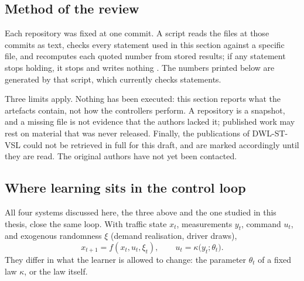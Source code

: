 \subsection{Method of the review}\label{sec:open-impl-method}

Each repository was fixed at one commit. A script reads the files at those commits as text, checks every statement used in this section against a specific file, and recomputes each quoted number from stored results; if any statement stops holding, it stops and writes nothing . The numbers printed below are generated by that script, which currently checks \OIFactCount{} statements.

Three limits apply. Nothing has been executed: this section reports what the artefacts contain, not how the controllers perform. A repository is a snapshot, and a missing file is not evidence that the authors lacked it; published work may rest on material that was never released. Finally, the publications of DWL-ST-VSL could not be retrieved in full for this draft, and are marked accordingly until they are read. The original authors have not yet been contacted.

\subsection{Where learning sits in the control loop}\label{sec:open-impl-design}

All four systems discussed here, the three above and the one studied in this thesis, close the same loop. With traffic state $x_t$, measurements $y_t$, command $u_t$, and exogenous randomness $\xi$ (demand realisation, driver draws),
\begin{equation}
x_{t+1}=f(x_t,u_t,\xi_t),\qquad u_t=\kappa\bigl(y_t;\theta_t\bigr).\label{eq:loop}
\end{equation}
They differ in what the learner is allowed to change: the parameter $\theta_t$ of a fixed law $\kappa$, or the law itself.

